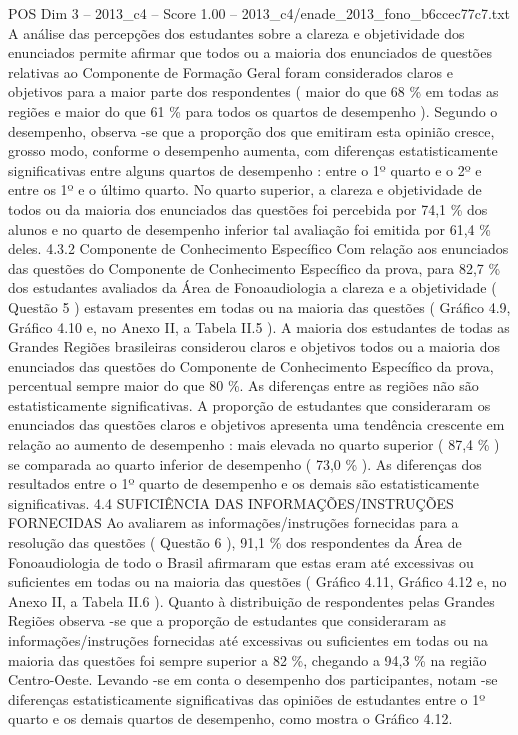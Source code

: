\begin{textsample}{POS Dim 3 – 2013\_c4 – Score 1.00 – 2013\_c4/enade\_2013\_fono\_b6ccec77c7.txt}
A análise das percepções dos estudantes sobre a clareza e objetividade dos enunciados permite afirmar que todos ou a maioria dos enunciados de questões relativas ao Componente de Formação Geral foram considerados claros e objetivos para a maior parte dos respondentes ( maior do que 68 \% em todas as regiões e maior do que 61 \% para todos os quartos de desempenho ).
Segundo o desempenho, observa -se que a proporção dos que emitiram esta opinião cresce, grosso modo, conforme o desempenho aumenta, com diferenças estatisticamente significativas entre alguns quartos de desempenho : entre o 1º quarto e o 2º e entre os 1º e o último quarto.
No quarto superior, a clareza e objetividade de todos ou da maioria dos enunciados das questões foi percebida por 74,1 \% dos alunos e no quarto de desempenho inferior tal avaliação foi emitida por 61,4 \% deles. 4.3.2 Componente de Conhecimento Específico Com relação aos enunciados das questões do Componente de Conhecimento Específico da prova, para 82,7 \% dos estudantes avaliados da Área de Fonoaudiologia a clareza e a objetividade ( Questão 5 ) estavam presentes em todas ou na maioria das questões ( Gráfico 4.9, Gráfico 4.10 e, no Anexo II, a Tabela II.5 ).
A maioria dos estudantes de todas as Grandes Regiões brasileiras considerou claros e objetivos todos ou a maioria dos enunciados das questões do Componente de Conhecimento Específico da prova, percentual sempre maior do que 80 \%.
As diferenças entre as regiões não são estatisticamente significativas.
A proporção de estudantes que consideraram os enunciados das questões claros e objetivos apresenta uma tendência crescente em relação ao aumento de desempenho : mais elevada no quarto superior ( 87,4 \% ) se comparada ao quarto inferior de desempenho ( 73,0 \% ).
As diferenças dos resultados entre o 1º quarto de desempenho e os demais são estatisticamente significativas. 4.4 SUFICIÊNCIA DAS INFORMAÇÕES/INSTRUÇÕES FORNECIDAS Ao avaliarem as informações/instruções fornecidas para a resolução das questões ( Questão 6 ), 91,1 \% dos respondentes da Área de Fonoaudiologia de todo o Brasil afirmaram que estas eram até excessivas ou suficientes em todas ou na maioria das questões ( Gráfico 4.11, Gráfico 4.12 e, no Anexo II, a Tabela II.6 ).
Quanto à distribuição de respondentes pelas Grandes Regiões observa -se que a proporção de estudantes que consideraram as informações/instruções fornecidas até excessivas ou suficientes em todas ou na maioria das questões foi sempre superior a 82 \%, chegando a 94,3 \% na região Centro-Oeste.
Levando -se em conta o desempenho dos participantes, notam -se diferenças estatisticamente significativas das opiniões de estudantes entre o 1º quarto e os demais quartos de desempenho, como mostra o Gráfico 4.12.

\end{textsample}
